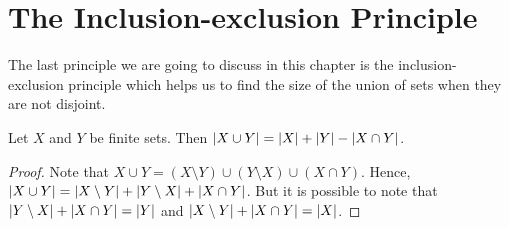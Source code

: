 \section{The Inclusion-exclusion Principle}

The last principle we are going to discuss in this chapter is the
inclusion-exclusion principle which helps us to find the size of the union
of sets when they are not disjoint.
\begin{theorem}
\label{theorem:inclusion-exclusion-principle}
  Let $X$ and $Y$ be finite sets. Then $\left|{X \cup Y}\right| = \left|{X}\right|
  + \left|{Y}\right| - \left|{X \cap Y}\right|$.
\end{theorem}
\begin{proof}
  Note that $X \cup Y = (X \setminus Y) \cup (Y \setminus X) \cup (X \cap Y)$.
  Hence, $\left|{X \cup Y}\right| = \left|{X \setminus Y}\right| + 
  \left|{Y \setminus X}\right| + \left|{X \cap Y}\right|$. But it
  is possible to note that $\left|{Y \setminus X}\right| + \left|{X \cap Y}\right|
  = \left|{Y}\right|$ and $\left|{X \setminus Y}\right| + \left|{X \cap Y}\right| =
  \left|{X}\right|$.
\end{proof}

